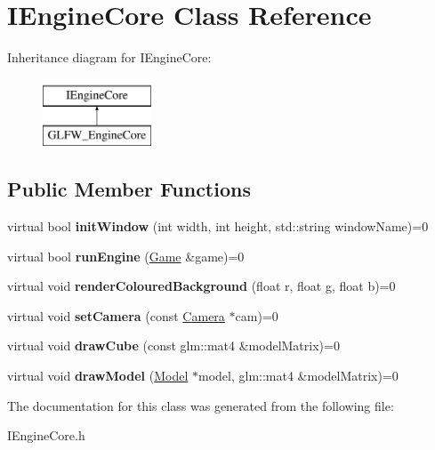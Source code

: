 \hypertarget{class_i_engine_core}{}\section{I\+Engine\+Core Class Reference}
\label{class_i_engine_core}
Inheritance diagram for I\+Engine\+Core\+:\begin{figure}[H]
\begin{center}
\leavevmode
\includegraphics[height=2.000000cm]{class_i_engine_core}
\end{center}
\end{figure}
\subsection*{Public Member Functions}
\begin{DoxyCompactItemize}
\item 
\mbox{\label{class_i_engine_core_a27123704f8f24eefd9cb47aa9986cbf3}} 
virtual bool {\bfseries init\+Window} (int width, int height, std\+::string window\+Name)=0
\item 
\mbox{\label{class_i_engine_core_ad03940f571ec20ba7427feeca44ace21}} 
virtual bool {\bfseries run\+Engine} (\mbox{\hyperlink{class_game}{Game}} \&game)=0
\item 
\mbox{\label{class_i_engine_core_a8f8e0778f04c50b680cdde167cb38e2f}} 
virtual void {\bfseries render\+Coloured\+Background} (float r, float g, float b)=0
\item 
\mbox{\label{class_i_engine_core_ab2f643ce25708c87b20eecdcbb18b9ac}} 
virtual void {\bfseries set\+Camera} (const \mbox{\hyperlink{class_camera}{Camera}} $\ast$cam)=0
\item 
\mbox{\label{class_i_engine_core_af24745492d6a7c8bd410a6849fbaf854}} 
virtual void {\bfseries draw\+Cube} (const glm\+::mat4 \&model\+Matrix)=0
\item 
\mbox{\label{class_i_engine_core_a454b3f14b3a567852d891c7543edfef7}} 
virtual void {\bfseries draw\+Model} (\mbox{\hyperlink{class_model}{Model}} $\ast$model, glm\+::mat4 \&model\+Matrix)=0
\end{DoxyCompactItemize}


The documentation for this class was generated from the following file\+:\begin{DoxyCompactItemize}
\item 
I\+Engine\+Core.\+h\end{DoxyCompactItemize}
